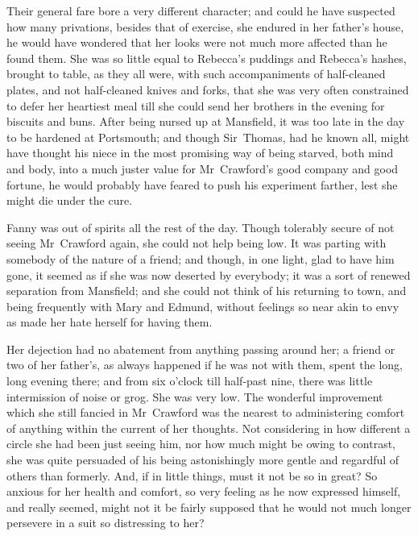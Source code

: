 Their general fare bore a very different character; and could he have suspected how many privations, besides that of exercise, she endured in her father's house, he would have wondered that her looks were not much more affected than he found them. She was so little equal to Rebecca's puddings and Rebecca's hashes, brought to table, as they all were, with such accompaniments of half-cleaned plates, and not half-cleaned knives and forks, that she was very often constrained to defer her heartiest meal till she could send her brothers in the evening for biscuits and buns. After being nursed up at Mansfield, it was too late in the day to be hardened at Portsmouth; and though Sir~Thomas, had he known all, might have thought his niece in the most promising way of being starved, both mind and body, into a much juster value for Mr~Crawford's good company and good fortune, he would probably have feared to push his experiment farther, lest she might die under the cure.

Fanny was out of spirits all the rest of the day. Though tolerably secure of not seeing Mr~Crawford again, she could not help being low. It was parting with somebody of the nature of a friend; and though, in one light, glad to have him gone, it seemed as if she was now deserted by everybody; it was a sort of renewed separation from Mansfield; and she could not think of his returning to town, and being frequently with Mary and Edmund, without feelings so near akin to envy as made her hate herself for having them.

Her dejection had no abatement from anything passing around her; a friend or two of her father's, as always happened if he was not with them, spent the long, long evening there; and from six o'clock till half-past nine, there was little intermission of noise or grog. She was very low. The wonderful improvement which she still fancied in Mr~Crawford was the nearest to administering comfort of anything within the current of her thoughts. Not considering in how different a circle she had been just seeing him, nor how much might be owing to contrast, she was quite persuaded of his being astonishingly more gentle and regardful of others than formerly. And, if in little things, must it not be so in great? So anxious for her health and comfort, so very feeling as he now expressed himself, and really seemed, might not it be fairly supposed that he would not much longer persevere in a suit so distressing to her? 